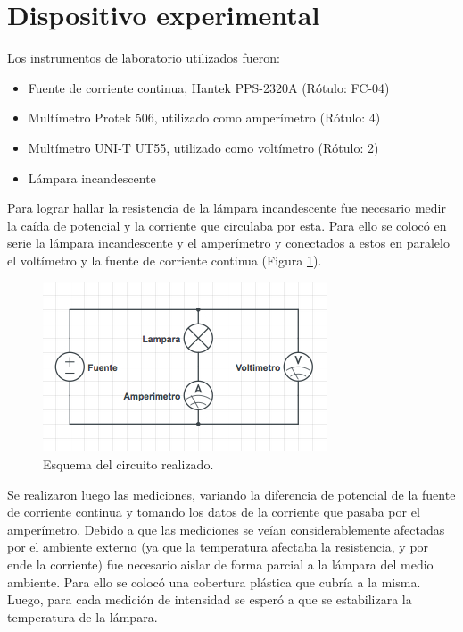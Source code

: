 \documentclass[twoside,twocolumn,a4paper]{article}
\begin{document}

\section{Dispositivo experimental}

Los instrumentos de laboratorio utilizados fueron:
\begin{itemize}
\item 
\label{Fuente} Fuente de corriente continua, Hantek PPS-2320A (R\'otulo: FC-04)
\cite{Fuente}
\item 
\label{amp} Mult\'imetro Protek 506, utilizado como amper\'imetro (R\'otulo: 4)
\cite{amp}
\item 
\label{volt} Mult\'imetro UNI-T UT55, utilizado como volt\'imetro (R\'otulo: 2)
\cite{volt}
\item L\'ampara incandescente
\end{itemize}

Para lograr hallar la resistencia de la l\'ampara incandescente fue necesario medir la ca\'ida de potencial y la corriente que circulaba por esta. Para ello se coloc\'o en serie la l\'ampara incandescente y el amper\'imetro y conectados a estos en paralelo el volt\'imetro y la fuente de corriente continua (Figura \ref{fig:dsp_exp}).\par

\begin{figure}
\includegraphics[width=\linewidth]{dispositivo_experimental.jpg}
\caption{Esquema del circuito realizado.}
\label{fig:dsp_exp}
\end{figure}

Se realizaron luego las mediciones, variando la diferencia de potencial de la fuente de corriente continua y tomando los datos de la corriente que pasaba por el amper\'imetro. Debido a que las mediciones se ve\'ian considerablemente afectadas por el ambiente externo (ya que la temperatura afectaba la resistencia, y por ende la corriente) fue necesario aislar de forma parcial a la l\'ampara del medio ambiente. Para ello se coloc\'o una cobertura pl\'astica que cubr\'ia a la misma. Luego, para cada medici\'on de intensidad se esper\'o a que se estabilizara la temperatura de la l\'ampara.
\end{document}
